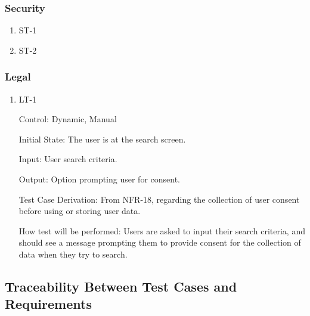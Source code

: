 \documentclass[12pt, titlepage]{article}
\begin{document}
\subsubsection {Security}
\begin{enumerate}
  \item{ST-1\\}
  
  \item {ST-2\\}







\end{enumerate}
\subsubsection{Legal}

\begin{enumerate}
\item{LT-1}

Control: Dynamic, Manual
					
Initial State: The user is at the search screen.

Input: User search criteria.

Output: Option prompting user for consent.

Test Case Derivation: From NFR-18, regarding the collection of user consent before using or storing user data.

How test will be performed: Users are asked to input their search criteria, and should see a message prompting them to provide consent for the collection of data when they try to search.

\end{enumerate}

\subsection{Traceability Between Test Cases and Requirements}
\end{document}
